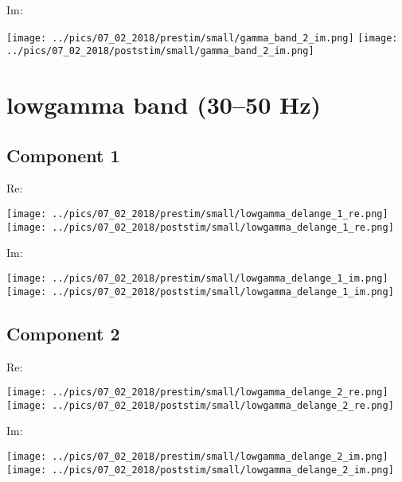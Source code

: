 \documentclass{article}
\begin{document}
Im:

\hspace{2cm}
\texttt{[image: ../pics/07\_02\_2018/prestim/small/gamma\_band\_2\_im.png]}
\hspace{2cm}
\texttt{[image: ../pics/07\_02\_2018/poststim/small/gamma\_band\_2\_im.png]}

\section{lowgamma band (30--50 Hz)}
\subsection*{Component 1}
Re:

\hspace{2cm}
\texttt{[image: ../pics/07\_02\_2018/prestim/small/lowgamma\_delange\_1\_re.png]}
\hspace{2cm}
\texttt{[image: ../pics/07\_02\_2018/poststim/small/lowgamma\_delange\_1\_re.png]}

Im:

\hspace{2cm}
\texttt{[image: ../pics/07\_02\_2018/prestim/small/lowgamma\_delange\_1\_im.png]}
\hspace{2cm}
\texttt{[image: ../pics/07\_02\_2018/poststim/small/lowgamma\_delange\_1\_im.png]}

\subsection*{Component 2}
Re:

\hspace{2cm}
\texttt{[image: ../pics/07\_02\_2018/prestim/small/lowgamma\_delange\_2\_re.png]}
\hspace{2cm}
\texttt{[image: ../pics/07\_02\_2018/poststim/small/lowgamma\_delange\_2\_re.png]}

Im:

\hspace{2cm}
\texttt{[image: ../pics/07\_02\_2018/prestim/small/lowgamma\_delange\_2\_im.png]}
\hspace{2cm}
\texttt{[image: ../pics/07\_02\_2018/poststim/small/lowgamma\_delange\_2\_im.png]}
\end{document}

